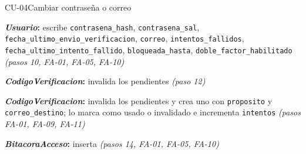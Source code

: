 \begin{fichacu}{CU-04}{Cambiar contraseña o correo}
{\begin{cudatos}
      \item \textbf{\textit{Usuario}:} escribe \texttt{contrasena\_\allowbreak{}hash}, \texttt{contrasena\_\allowbreak{}sal}, \texttt{fecha\_\allowbreak{}ultimo\_\allowbreak{}envio\_\allowbreak{}verificacion}, \texttt{correo}, \texttt{intentos\_\allowbreak{}fallidos}, \texttt{fecha\_\allowbreak{}ultimo\_\allowbreak{}intento\_\allowbreak{}fallido}, \texttt{bloqueada\_\allowbreak{}hasta}, \texttt{doble\_\allowbreak{}factor\_\allowbreak{}habilitado} \textit{(pasos 10, \mbox{FA-01}, \mbox{FA-05}, \mbox{FA-10})}
      \item \textbf{\textit{CodigoVerificacion}:} invalida los pendientes \textit{(paso 12)}
      \item \textbf{\textit{CodigoVerificacion}:} invalida los pendientes y crea uno con \texttt{proposito} y \texttt{correo\_\allowbreak{}destino}; lo marca como usado o invalidado e incrementa \texttt{intentos} \textit{(pasos \mbox{FA-01}, \mbox{FA-09}, \mbox{FA-11})}
      \item \textbf{\textit{BitacoraAcceso}:} inserta \textit{(pasos 14, \mbox{FA-01}, \mbox{FA-05}, \mbox{FA-10})}
    \end{cudatos}} \\ \hline
\end{fichacu}
\clearpage
